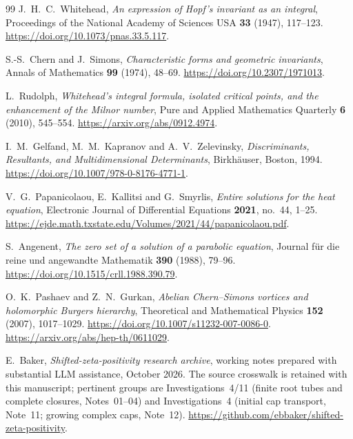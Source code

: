 \begin{thebibliography}{99}
J.~H.~C.~Whitehead, \emph{An expression of Hopf's invariant as an
integral}, Proceedings of the National Academy of Sciences USA
\textbf{33} (1947), 117--123.
\url{https://doi.org/10.1073/pnas.33.5.117}.

S.-S.~Chern and J.~Simons, \emph{Characteristic forms and
geometric invariants}, Annals of Mathematics \textbf{99}
(1974), 48--69.
\url{https://doi.org/10.2307/1971013}.

L.~Rudolph, \emph{Whitehead's integral formula, isolated critical
points, and the enhancement of the Milnor number},
Pure and Applied Mathematics Quarterly \textbf{6} (2010), 545--554.
\url{https://arxiv.org/abs/0912.4974}.

I.~M.~Gelfand, M.~M.~Kapranov and A.~V.~Zelevinsky,
\emph{Discriminants, Resultants, and Multidimensional Determinants},
Birkh\"auser, Boston, 1994.
\url{https://doi.org/10.1007/978-0-8176-4771-1}.

V.~G.~Papanicolaou, E.~Kallitsi and G.~Smyrlis,
\emph{Entire solutions for the heat equation}, Electronic Journal
of Differential Equations \textbf{2021}, no.~44, 1--25.
\url{https://ejde.math.txstate.edu/Volumes/2021/44/papanicolaou.pdf}.

S.~Angenent, \emph{The zero set of a solution of a parabolic
equation}, Journal f\"ur die reine und angewandte Mathematik
\textbf{390} (1988), 79--96.
\url{https://doi.org/10.1515/crll.1988.390.79}.

O.~K.~Pashaev and Z.~N.~Gurkan, \emph{Abelian Chern--Simons
vortices and holomorphic Burgers hierarchy}, Theoretical and
Mathematical Physics \textbf{152} (2007), 1017--1029.
\url{https://doi.org/10.1007/s11232-007-0086-0}.
\url{https://arxiv.org/abs/hep-th/0611029}.

E.~Baker, \emph{Shifted-zeta-positivity research archive},
working notes prepared with substantial LLM assistance, October 2026.
The source crosswalk is retained with this manuscript; pertinent
groups are Investigations~4/11 (finite root tubes and complete
closures, Notes~01--04) and Investigations~4 (initial cap transport,
Note~11; growing complex caps, Note~12).
\url{https://github.com/ebbaker/shifted-zeta-positivity}.
\end{thebibliography}
